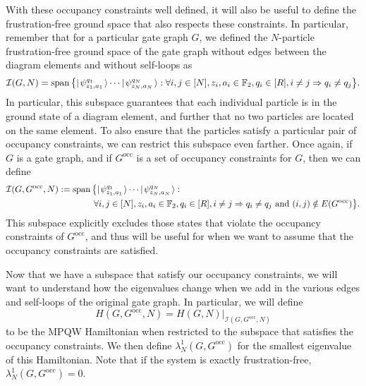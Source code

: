 \documentclass[../thesis-main/thesis-main]{subfiles}
\begin{document}

With these occupancy constraints well defined, it will also be useful to define the frustration-free ground space that also respects these constraints.  In particular, remember that for a particular gate graph $G$, we defined the $N$-particle frustration-free ground space of the gate graph without edges between the diagram elements and without self-loops as
\begin{equation}
  \mathcal{I}(G,N) = \operatorname{span} \big\{ |\mspace{2mu} \psi_{z_1,a_1}^{q_1} \mspace{2mu} \rangle \cdots |\mspace{2mu} \psi_{z_N,a_N}^{q_N} \mspace{2mu} \rangle  :  \forall i,j\in [N], z_i,a_i\in \mathbb{F}_2, q_i\in [R], i\neq j \Rightarrow q_i\neq q_j\big\}.
\end{equation}
In particular, this subspace guarantees that each individual particle is in the ground state of a diagram element, and further that no two particles are located on the same element.  To also ensure that the particles satisfy a particular pair of occupancy constraints, we can restrict this subspace even farther.  Once again, if $G$ is a gate graph, and if $G^{\text{occ}}$ is a set of occupancy constraints for $G$, then we can define
\begin{align}
  \mathcal{I}(G,G^{\text{occ}},N) &:= \operatorname{span}\big\{ |\mspace{2mu} \psi_{z_1,a_1}^{q_1} \mspace{2mu} \rangle \cdots |\mspace{2mu} \psi_{z_N,a_N}^{q_N} \mspace{2mu} \rangle:\nonumber\\
  &\qquad\qquad  \forall i,j\in [N], z_i,a_i\in \mathbb{F}_2, q_i\in [R], i\neq j \Rightarrow q_i\neq q_j \text{ and } (i,j)\notin E(G^{\text{occ}})\big\}.
\end{align}
This subspace explicitly excludes those states that violate the occupancy constraints of $G^{\text{occ}}$, and thus will be useful for when we want to assume that the occupancy constraints are satisfied. 

Now that we have a subspace that satisfy our occupancy constraints, we will want to understand how the eigenvalues change when we add in the various edges and self-loops of the original gate graph.  In particular, we will define
\begin{equation}
  H(G,G^{\text{occ}},N) = H(G,N) \big |_{\mathcal{I}(G,G^{\text{occ}},N)}
\end{equation}
to be the MPQW Hamiltonian when restricted to the subspace that satisfies the occupancy constraints.  We then define $\lambda_N^1(G,G^{\text{occ}})$ for the smallest eigenvalue of this Hamiltonian.  Note that if the system is exactly frustration-free, $\lambda_N^1(G,G^{\text{occ}}) = 0$.
\end{document}
